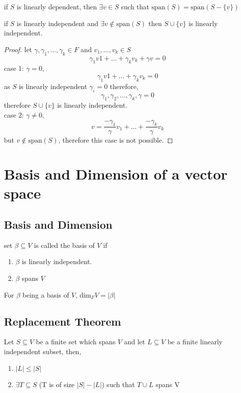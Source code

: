 \documentclass[11pt,a4paper]{colorart}
\def\l{\left}
\def\r{\right}
\def\b{\beta}
\def\g{\gamma}
\begin{document}
\begin{remark}
	if $S$ is linearly dependent, then $\exists v\in S$ such that $\text{span}\l(S\r) = \text{span}\l(S-\{v\}\r)$ 
\end{remark}

\begin{proposition}
	if $S$ is linearly independent and $\exists v \notin \text{span}\l(S\r)$ then $S\cup\{v\}$ is linearly independent.
\end{proposition}

\begin{proof}
	let $\g,\g_1,\dots,\g_k \in F$ and $v_1,\dots,v_k \in S$
	\[ \g_1 v1 + \dots + \g_k v_k + \g v = 0\]
	case 1: $\g = 0$,
	\[ \g_1 v1 + \dots + \g_k v_k  = 0\]
	as $S$ is linearly independent $\g_i = 0$ therefore,
	\[ \g_1,\g_2,\dots,\g_k,\g = 0 \]
	therefore $S\cup\{v\}$ is linearly independent.\\
	case 2: $\g \neq 0$,
	\[ v = \frac{-\g_1}{\g} v_1 + \dots + \frac{-\g_k}{\g}v_k \]
	but $v\notin \text{span}\l(S\r)$, therefore this case is not possible.
\end{proof}

\section{Basis and Dimension of a vector space}

\subsection{Basis and Dimension}

\begin{definition}[Basis]
	set $\b\subseteq V$ is called the basis of $V$ if
	\begin{enumerate}
		\item $\b$ is linearly independent.
		\item $\b$ spans $V$
	\end{enumerate}
\end{definition}

\begin{definition}[Dimension]
	For $\b$ being a basis of $V$, $\text{dim}_FV = |\b|$
\end{definition}

\subsection{Replacement Theorem}

\begin{theorem}
	    Let $S\subseteq V$ be a finite set which spans $V$ and let $L\subseteq V$  be a finite linearly independent subset, then,
	    \begin{enumerate}
		    \item $|L| \leq |S|$
		    \item $\exists T \subseteq S$ (T is of size $|S|-|L|$) such that $T\cup L$ spans V
	    \end{enumerate}
\end{theorem}
\end{document}
